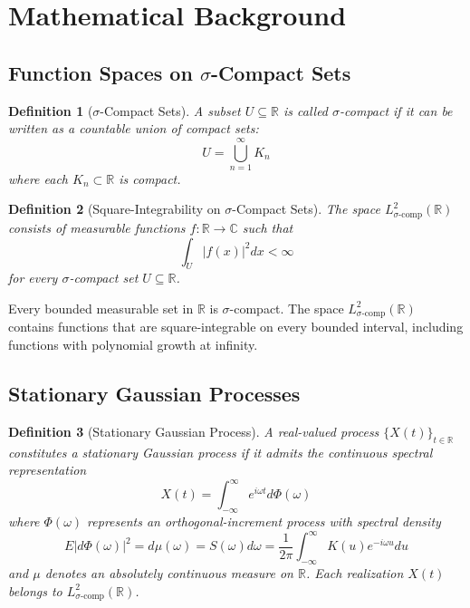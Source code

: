 \documentclass{article}
\newtheorem{definition}{Definition}
\begin{document}
\section{Mathematical Background}

\subsection{Function Spaces on $\sigma$-Compact Sets}

\begin{definition}
  [$\sigma$-Compact Sets]\label{def:sigma_compact} A subset $U \subseteq
  \mathbb{R}$ is called $\sigma$-compact if it can be written as a countable
  union of compact sets:
  \begin{equation}
    U = \bigcup_{n = 1}^{\infty} K_n
  \end{equation}
  where each $K_n \subset \mathbb{R}$ is compact.
\end{definition}

\begin{definition}
  [Square-Integrability on $\sigma$-Compact Sets]\label{def:L2_sigma_compact}
  The space $L^2_{\sigma \text{-comp}} (\mathbb{R})$ consists of measurable
  functions $f : \mathbb{R} \to \mathbb{C}$ such that
  \begin{equation}
    \int_U |f (x) |^2 dx < \infty
  \end{equation}
  for every $\sigma$-compact set $U \subseteq \mathbb{R}$.
\end{definition}

\begin{remark}
  \label{rem:sigma_compact_properties}Every bounded measurable set in
  $\mathbb{R}$ is $\sigma$-compact. The space $L^2_{\sigma \text{-comp}}
  (\mathbb{R})$ contains functions that are square-integrable on every bounded
  interval, including functions with polynomial growth at infinity.
\end{remark}

\subsection{Stationary Gaussian Processes}

\begin{definition}
  [Stationary Gaussian Process]\label{def:stationary} A real-valued process
  $\{X (t)\}_{t \in \mathbb{R}}$ constitutes a stationary Gaussian process if
  it admits the continuous spectral representation
  \begin{equation}
    \label{eq:stationary_rep} X (t) = \int_{- \infty}^{\infty} e^{i \omega t}
    d \Phi (\omega)
  \end{equation}
  where $\Phi (\omega)$ represents an orthogonal-increment process with
  spectral density
  \begin{equation}
    E |d \Phi (\omega) |^2 = d \mu (\omega) = S (\omega) d \omega = \frac{1}{2
    \pi}  \int_{- \infty}^{\infty} K (u) e^{- i \omega u} du
  \end{equation}
  and $\mu$ denotes an absolutely continuous measure on $\mathbb{R}$. Each
  realization $X (t)$ belongs to $L^2_{\sigma \text{-comp}} (\mathbb{R})$.
\end{definition}
\end{document}
